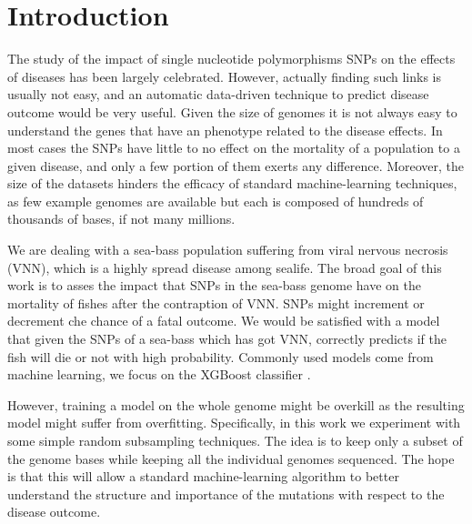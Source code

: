 \section{Introduction}
\label{sec:intro}
The study of the impact of single nucleotide polymorphisms SNPs on the effects of diseases has been largely celebrated. 
However, actually finding such links is usually not easy, and an automatic data-driven technique to predict disease outcome would be very useful.
Given the size of genomes it is not always easy to understand the genes that have an phenotype related to the disease effects.
In most cases the SNPs have little to no effect on the mortality of a population to a given disease, and only a few portion of them exerts any difference.
Moreover, the size of the datasets hinders the efficacy of standard machine-learning techniques, as few example genomes are available but each is composed of hundreds of thousands of bases, if not many millions.

We are dealing with a sea-bass population suffering from viral nervous necrosis (VNN), which is a highly spread disease among sealife.
The broad goal of this work is to asses the impact that SNPs in the sea-bass genome have on the mortality of fishes after the contraption of VNN.
SNPs might increment or decrement che chance of a fatal outcome. 
We would be satisfied with a model that given the SNPs of a sea-bass which has got VNN, correctly predicts if the fish will die or not with high probability.
Commonly used models come from machine learning, we focus on the XGBoost classifier \cite{xgboost}.

However, training a model on the whole genome might be overkill as the resulting model might suffer from overfitting.
Specifically, in this work we experiment with some simple random subsampling techniques.
The idea is to keep only a subset of the genome bases while keeping all the individual genomes sequenced.
The hope is that this will allow a standard machine-learning algorithm to better understand the structure and importance of the mutations with respect to the disease outcome.

